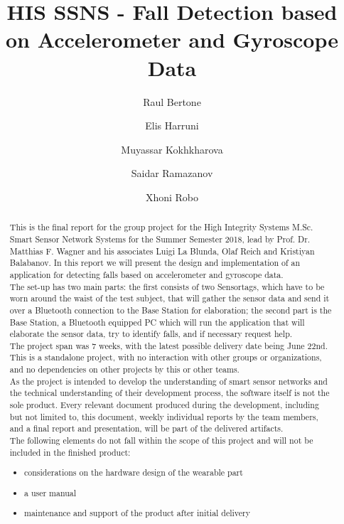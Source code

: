 \documentclass[conference,12pt]{IEEETran}
\title{HIS SSNS - Fall Detection based on Accelerometer and Gyroscope Data}
\author{
	 Raul Bertone
\and Elis Harruni
\and Muyassar Kokhkharova
\and Saidar Ramazanov
\and Xhoni Robo
}
\begin{document}
\maketitle

\begin{abstract}

This is the final report for the group project for the High Integrity Systems M.Sc. Smart Sensor Network Systems for the Summer Semester 2018, lead by Prof. Dr. Matthias F. Wagner and his associates Luigi La Blunda, Olaf Reich and Kristiyan Balabanov. In this report we will present the design and implementation of an application for detecting falls based on accelerometer and gyroscope data\cite{lablunda}.\\
The set-up has two main parts: the first consists of two Sensortags, which have to be worn around the waist of the test subject, that will gather the sensor data and send it over a Bluetooth connection to the Base Station for elaboration; the second part is the Base Station, a Bluetooth equipped PC which will run the application that will elaborate the sensor data, try to identify falls, and if necessary request help.\\
The project span was 7 weeks, with the latest possible delivery date being June 22nd.\\
This is a standalone project, with no interaction with other groups or organizations, and no dependencies on other projects by this or other teams.\\
As the project is intended to develop the understanding of smart sensor networks and the technical understanding of their development process, the software itself is not the sole product. Every relevant document produced during the development, including but not limited to, this document, weekly individual reports by the team members, and a final report and presentation, will be part of the delivered artifacts.\\
The following elements do not fall within the scope of this project and will not be included in the finished product:
\begin{itemize}
	\item considerations on the hardware design of the wearable part
	\item a user manual
	\item maintenance and support of the product after initial delivery
\end{itemize}	
\end{abstract}
\end{document}
